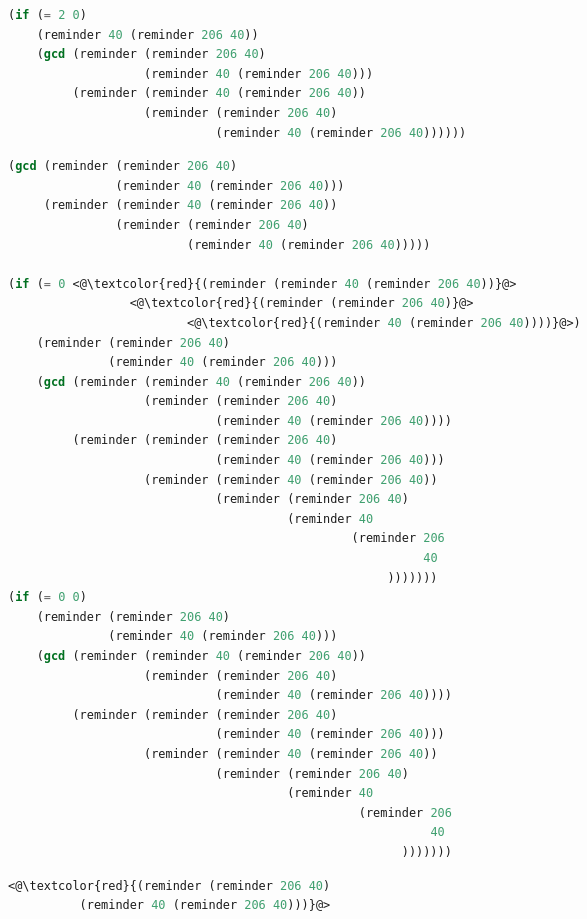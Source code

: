 \documentclass[11pt, a4paper]{article}
\begin{document}
\begin{CJK}{UTF8}{gkai}
\begin{lstlisting}[language=Lisp, caption=Four times]
(if (= 2 0)
    (reminder 40 (reminder 206 40))
    (gcd (reminder (reminder 206 40) 
                   (reminder 40 (reminder 206 40))) 
         (reminder (reminder 40 (reminder 206 40)) 
                   (reminder (reminder 206 40) 
                             (reminder 40 (reminder 206 40))))))
\end{lstlisting}

\begin{lstlisting}[language=Lisp, caption=Seven times]
(gcd (reminder (reminder 206 40) 
               (reminder 40 (reminder 206 40))) 
     (reminder (reminder 40 (reminder 206 40)) 
               (reminder (reminder 206 40) 
                         (reminder 40 (reminder 206 40)))))

(if (= 0 <@\textcolor{red}{(reminder (reminder 40 (reminder 206 40))}@> 
                 <@\textcolor{red}{(reminder (reminder 206 40)}@> 
                         <@\textcolor{red}{(reminder 40 (reminder 206 40))))}@>)
    (reminder (reminder 206 40) 
              (reminder 40 (reminder 206 40)))
    (gcd (reminder (reminder 40 (reminder 206 40)) 
                   (reminder (reminder 206 40) 
                             (reminder 40 (reminder 206 40)))) 
         (reminder (reminder (reminder 206 40) 
                             (reminder 40 (reminder 206 40))) 
                   (reminder (reminder 40 (reminder 206 40)) 
                             (reminder (reminder 206 40) 
                                       (reminder 40 
                                                (reminder 206 
                                                          40
                                                     )))))))
(if (= 0 0)
    (reminder (reminder 206 40) 
              (reminder 40 (reminder 206 40)))
    (gcd (reminder (reminder 40 (reminder 206 40)) 
                   (reminder (reminder 206 40) 
                             (reminder 40 (reminder 206 40)))) 
         (reminder (reminder (reminder 206 40) 
                             (reminder 40 (reminder 206 40))) 
                   (reminder (reminder 40 (reminder 206 40)) 
                             (reminder (reminder 206 40) 
                                       (reminder 40 
                                                 (reminder 206 
                                                           40
                                                       )))))))
\end{lstlisting}

\begin{lstlisting}[language=Lisp,caption=Four times]
<@\textcolor{red}{(reminder (reminder 206 40) 
          (reminder 40 (reminder 206 40)))}@>


\end{lstlisting}
\end{CJK}
\end{document}
